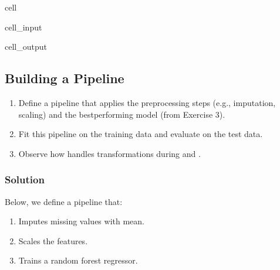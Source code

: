 \documentclass[letterpaper,10pt,english]{jupyterBook}
\begin{document}
\begin{sphinxuseclass}{cell}
\begin{sphinxVerbatimInput}
\begin{sphinxuseclass}{cell_input}
\end{sphinxuseclass}\end{sphinxVerbatimInput}
\begin{sphinxVerbatimOutput}

\begin{sphinxuseclass}{cell_output}
\noindent{}

\end{sphinxuseclass}\end{sphinxVerbatimOutput}

\end{sphinxuseclass}

\subsection{Building a Pipeline}
\label{\detokenize{03:building-a-pipeline}}\begin{enumerate}
%
\item {} 
\sphinxAtStartPar
Define a pipeline that applies the preprocessing steps (e.g., imputation, scaling) and the best\sphinxhyphen{}performing model (from Exercise 3).

\item {} 
\sphinxAtStartPar
Fit this pipeline on the training data and evaluate on the test data.

\item {} 
\sphinxAtStartPar
Observe how  handles transformations during  and .

\end{enumerate}


\subsubsection{Solution}
\label{\detokenize{03:id2}}
\sphinxAtStartPar
Below, we define a pipeline that:
\begin{enumerate}
%
\item {} 
\sphinxAtStartPar
Imputes missing values with mean.

\item {} 
\sphinxAtStartPar
Scales the features.

\item {} 
\sphinxAtStartPar
Trains a random forest regressor.

\end{enumerate}
\end{document}
